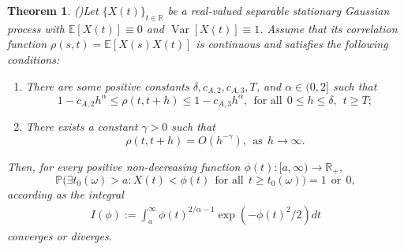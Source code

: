 \documentclass[11pt,reqno]{amsart}
\DeclareMathOperator{\Var}{Var}
\numberwithin{equation}{section}
\newtheorem{theorem}{Theorem}[section]
\def\EE{\mathbb{E}}
\newcommand\bp{\mathbb{P}}
\newcommand{\1}{{\bf 1}}
\newcommand{\2}{{\bf 2}}
\begin{document}
\begin{theorem}{\rm (\cite[Theorems 1.1, 2.1 and 2.2]{QW1971})}\label{Asymptotic}
Let $\{X(t)\}_{t\in\mathbb{R}}$ be a real-valued separable stationary Gaussian process with $\EE[X(t)] \equiv 0$ and $\Var[X(t)] \equiv 1$. Assume that  its correlation function $\rho(s,t) = \EE[X(s)X(t)]$ is continuous and  satisfies the following conditions:
\begin{enumerate}
\item[(1)]
There are some  positive constants $\delta, c_{A,2}, c_{A,3}, T$, and $\alpha\in (0,2]$ such that
$$
1-c_{A,2}h^\alpha \leq \rho(t,t+h) \leq 1-c_{A,3} h^\alpha,\ \ \text{for all}\ \ 0\le h\le \delta, \  \ t\ge T;
$$
\item[(2)]
There exists a constant $\gamma>0$ such that
$$
\rho(t,t+h)=O(h^{-\gamma}),\ \ \text{as}\ \ h\rightarrow\infty.
$$
\end{enumerate}
Then, for every   positive  non-decreasing function $\phi(t): [a,\infty)\rightarrow \mathbb R_+$,
$$
 \bp\Big( \exists t_0(\omega)>a: X(t)<\phi(t)\ \ \text{for all}\ \ t\geq t_0(\omega)\Big)=1\ \ \text{or}\ \ 0,
$$
according as the integral
\begin{align}\label{eq inte test}
I(\phi):=\int_a^\infty {\phi(t)}^{2/\alpha-1}\exp\left( -\phi(t)^2/2\right)dt
\end{align}
converges or diverges. 
\end{theorem}
\end{document}
